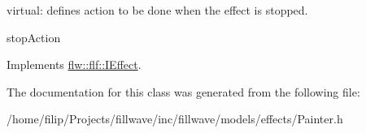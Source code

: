 virtual\+: defines action to be done when the effect is stopped. 

stop\+Action 

Implements \hyperlink{classflw_1_1flf_1_1IEffect_a1a03eaf63a9d4edbd8764540d2d4133c}{flw\+::flf\+::\+I\+Effect}.



The documentation for this class was generated from the following file\+:\begin{DoxyCompactItemize}
\item 
/home/filip/\+Projects/fillwave/inc/fillwave/models/effects/Painter.\+h\end{DoxyCompactItemize}
